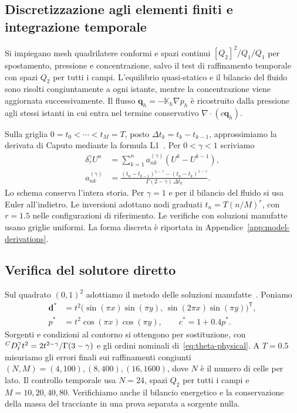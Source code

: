\subsection{Discretizzazione agli elementi finiti e integrazione temporale}
\label{sec:numerical-discretization}

Si impiegano mesh quadrilatere conformi e spazi continui $[Q_2]^2/Q_1/Q_1$ per spostamento, pressione e concentrazione, salvo il test di raffinamento temporale con spazi $Q_2$ per tutti i campi. L'equilibrio quasi-statico e il bilancio del fluido sono risolti congiuntamente a ogni istante, mentre la concentrazione viene aggiornata successivamente. Il flusso $\mathbf q_h=-\mathbb K_h\nabla p_h$ è ricostruito dalla pressione agli stessi istanti in cui entra nel termine conservativo $\nabla\cdot(c\mathbf q_h)$.

Sulla griglia $0=t_0<\cdots<t_M=T$, posto $\Delta t_k=t_k-t_{k-1}$, approssimiamo la derivata di Caputo mediante la formula L1~\citep{kopteva2019error}. Per $0<\gamma<1$ scriviamo
\begin{equation}
\begin{aligned}
 \delta_\tau^\gamma U^n &= \sum_{k=1}^{n} a_{nk}^{(\gamma)}(U^k-U^{k-1}),\\
 a_{nk}^{(\gamma)} &=
 \frac{(t_n-t_{k-1})^{1-\gamma}-(t_n-t_k)^{1-\gamma}}
      {\Gamma(2-\gamma)\,\Delta t_k}.
\end{aligned}
\label{eq:l1}
\end{equation}
Lo schema conserva l'intera storia. Per $\gamma=1$ e per il bilancio del fluido si usa Euler all'indietro. Le inversioni adottano nodi graduati $t_n=T(n/M)^r$, con $r=1.5$ nelle configurazioni di riferimento. Le verifiche con soluzioni manufatte usano griglie uniformi. La forma discreta è riportata in Appendice~\ref{app:model-derivations}.

\subsection{Verifica del solutore diretto}
\label{sec:mms-protocol}

Sul quadrato $(0,1)^2$ adottiamo il metodo delle soluzioni manufatte~\citep{roache2001code}. Poniamo
\[
\begin{aligned}
 \mathbf d^*&=t^2\bigl(\sin(\pi x)\sin(\pi y),\,
                   \sin(2\pi x)\sin(\pi y)\bigr)^{\mathsf T},\\
 p^*&=t^2\cos(\pi x)\cos(\pi y),\qquad c^*=1+0.4p^* .
\end{aligned}
\]
Sorgenti e condizioni al contorno si ottengono per sostituzione, con ${}^{C}D_t^{\gamma}t^2=2t^{2-\gamma}/\Gamma(3-\gamma)$ e gli ordini nominali di~\eqref{eq:theta-physical}. A $T=0.5$ misuriamo gli errori finali sui raffinamenti congiunti $(N,M)=(4,100),(8,400),(16,1600)$, dove $N$ è il numero di celle per lato. Il controllo temporale usa $N=24$, spazi $Q_2$ per tutti i campi e $M=10,20,40,80$. Verifichiamo anche il bilancio energetico e la conservazione della massa del tracciante in una prova separata a sorgente nulla.


